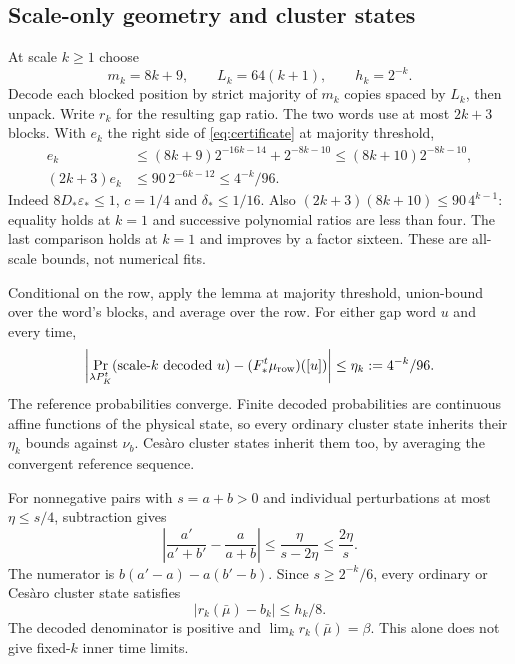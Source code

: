 \subsection{Scale-only geometry and cluster states}
At scale $k\geq1$ choose
\begin{equation}\label{eq:scalegeometry}
 m_k=8k+9,\qquad L_k=64(k+1),\qquad h_k=2^{-k}.
\end{equation}
Decode each blocked position by strict majority of $m_k$ copies
spaced by $L_k$, then unpack. Write $r_k$ for the resulting gap
ratio. The two words use at most $2k+3$ blocks. With $e_k$ the
right side of \eqref{eq:certificate} at majority threshold,
\begin{align}
 e_k&\leq(8k+9)2^{-16k-14}+2^{-8k-10}
                       \leq(8k+10)2^{-8k-10},\label{eq:ek}\\
 (2k+3)e_k&\leq90\,2^{-6k-12}\leq4^{-k}/96.\label{eq:budget}
\end{align}
Indeed $8D_*\varepsilon_*\leq1$, $c=1/4$ and $\delta_*\leq1/16$.
Also $(2k+3)(8k+10)\leq90\,4^{k-1}$: equality holds at $k=1$
and successive polynomial ratios are less than four. The last
comparison holds at $k=1$ and improves by a factor sixteen.
These are all-scale bounds, not numerical fits.

Conditional on the row, apply the lemma at majority threshold,
union-bound over the word's blocks, and average over the row.
For either gap word $u$ and every time,
\begin{equation}\label{eq:fixedworderror}
 \left|\Pr_{\lambda P_K^t}(\text{scale-}k\text{ decoded }u)
             -(F_*^t\mu_{\rm row})([u])\right|\leq\eta_k:=4^{-k}/96.
\end{equation}
The reference probabilities converge. Finite decoded probabilities
are continuous affine functions of the physical state, so every
ordinary cluster state inherits their $\eta_k$ bounds against
$\nu_b$. Ces\`aro cluster states inherit them too, by averaging
the convergent reference sequence.

For nonnegative pairs with $s=a+b>0$ and individual perturbations
at most $\eta\leq s/4$, subtraction gives
\begin{equation}\label{eq:ratiobound}
 \left|\frac{a'}{a'+b'}-\frac a{a+b}\right|
 \leq\frac{\eta}{s-2\eta}\leq\frac{2\eta}{s}.
\end{equation}
The numerator is $b(a'-a)-a(b'-b)$. Since $s\geq2^{-k}/6$,
every ordinary or Ces\`aro cluster state satisfies
\begin{equation}\label{eq:cluster-ratio}
 |r_k(\bar\mu)-b_k|\leq h_k/8.
\end{equation}
The decoded denominator is positive and $\lim_k r_k(\bar\mu)=\beta$.
This alone does not give fixed-$k$ inner time limits.

